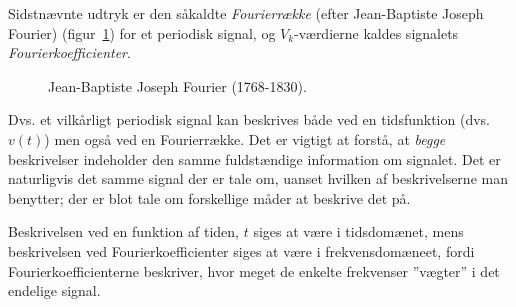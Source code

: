 \documentclass[11pt,a4paper]{article}
\begin{document}
\noindent{}Sidstnævnte udtryk er den såkaldte \emph{Fourierrække} (efter Jean-Baptiste Joseph Fourier) (figur~\ref{fig:jbjfourier}) for et periodisk signal, og $V_k$-værdierne kaldes signalets \emph{Fourierkoefficienter}.
\begin{figure}[htbp]
\centering
{}
\label{fig:jbjfourier}
\caption{\label{fig:jbjfourier}Jean-Baptiste Joseph Fourier (1768-1830).}
\end{figure}

Dvs. et vilkårligt periodisk signal kan beskrives både ved en tidsfunktion (dvs. $v(t)$) men også ved en Fourierrække. Det er vigtigt at forstå, at \emph{begge} beskrivelser indeholder den samme fuldstændige information om signalet. Det er naturligvis det samme signal der er tale om, uanset hvilken af beskrivelserne man benytter; der er blot tale om forskellige måder at beskrive det på.

Beskrivelsen ved en funktion af tiden, $t$ siges at være i tidsdomænet, mens beskrivelsen ved Fourierkoefficienter siges at være i frekvensdomæneet, fordi Fourierkoefficienterne beskriver, hvor meget de enkelte frekvenser ''vægter'' i det endelige signal.
\end{document}
